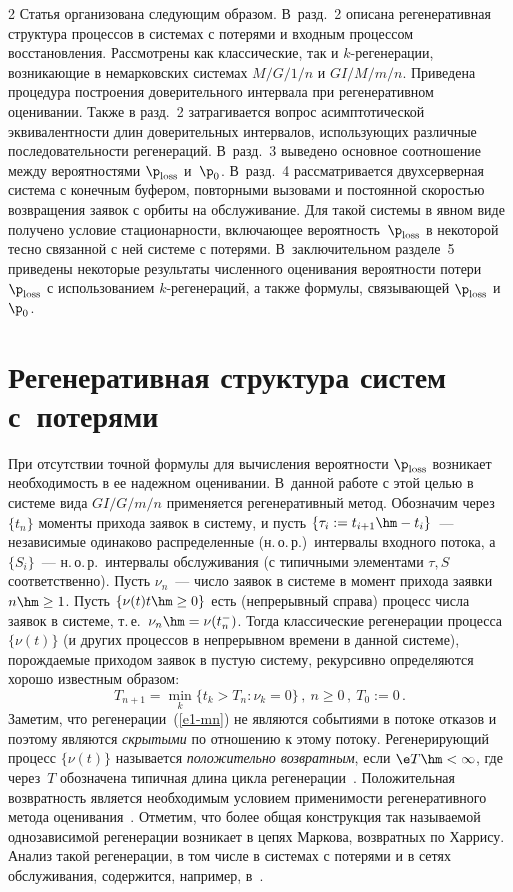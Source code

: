 \begin{multicols}{2}
Статья организована следующим образом. В~разд.~2  описана регенеративная
структура процессов в сис\-те\-мах с потерями и входным процессом восстановления.
Рассмотрены как классические, так и $k$-ре\-ге\-не\-ра\-ции, возникающие в немарковских
сис\-те\-мах $M/G/1/n$ и  $GI/M/m/n$. Приведена процедура построения
доверительного интервала при регенеративном оценивании. Также в разд.~2
затрагивается вопрос асимптотической эквивалентности длин доверительных
интервалов, использующих различные последовательности  регенераций. В~разд.~3
 выведено основное соотношение между  вероятностями   $\p_{\mathrm{loss}}$ и~$\p_0$.
 В~разд.~4 рассматривается двухсерверная система с конечным буфером,
 повторными вызовами и постоянной скоростью возвращения заявок с орбиты на обслуживание.
Для такой системы в явном виде получено условие стационарности, включающее
вероятность~$\p_{\mathrm{loss}}$ в некоторой тесно связанной с ней системе с потерями. 
В~заключительном разделе~5 приведены некоторые результаты численного оценивания
ве\-ро\-ят\-ности потери $\p_{\mathrm{loss}}$ с использованием $k$-ре\-ге\-не\-ра\-ций, а также
формулы, связывающей $\p_{\mathrm{loss}}$ и~$\p_0$.

\section{Регенеративная структура систем с~потерями}

При отсутствии точной формулы для вычисления вероятности $\p_{\mathrm{loss}}$
возникает необходимость в ее надежном  оценивании. В~данной работе с
этой целью  в сис\-те\-ме вида $GI/G/m/n$ применяется регенеративный
метод. Обозначим через $\{t_n\}$ моменты прихода заявок в сис\-те\-му, и
пусть $\{\tau_i:=t_{i+1}\hm-t_i\}$~--- независимые одинаково
распределенные (н.\,о.\,р.)\ интервалы входного потока, а $\{S_i\}$~---
н.\,о.\,р.\ интервалы обслуживания (с типичными элементами $\tau,S$
соответственно). Пусть $\nu_n$~--- число заявок в сис\-те\-ме в момент
прихода заявки $n\hm\ge 1$. Пусть $\{\nu(t)t\hm\ge 0\}$ есть
(непрерывный справа) процесс числа заявок в сис\-те\-ме, т.\,е.\
$\nu_n\hm=\nu(t_n^-)$. Тогда классические регенерации процесса $\{\nu(t)\}$ 
(и других процессов в непрерывном времени в данной сис\-те\-ме),
по\-рож\-да\-емые приходом заявок в пустую сис\-те\-му, рекурсивно
определяются хорошо известным образом: 
\begin{equation}
T_{n+1}=\min\limits_k\{t_k>T_n: \nu_k=0\}\,, \ n \ge 0\,,\ T_0:=0\,.
\label{e1-mn} 
\end{equation} 
Заметим, что регенерации~(\ref{e1-mn}) не являются событиями в потоке отказов и 
поэтому являются \emph{скрытыми} по отношению к этому потоку. Регенерирующий процесс
$\{\nu(t)\}$ называется {\it положительно возвратным}, если $\e T\hm<\infty$, где через~$T$ 
обозначена типичная длина цикла регенерации~\cite{Wolff, Morozov2004}.
 Положительная возвратность является необходимым условием
применимости регенеративного метода оценивания~\cite{Asmus}. Отметим, что более
общая конструкция так называемой однозависимой регенерации возникает в цепях
Маркова, возвратных по Харрису. Анализ такой регенерации, в том числе в
сис\-те\-мах с потерями и в  сетях обслуживания, содержится, например, в~\cite{Sig2, Sig3}.


\end{multicols}
